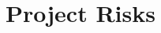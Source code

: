 \documentclass[\mainpath/main]{subfiles}
\begin{document}
\chapter{Project Risks} %
\label{ProjectRisks}

\setmyfancystyle
\end{document}
